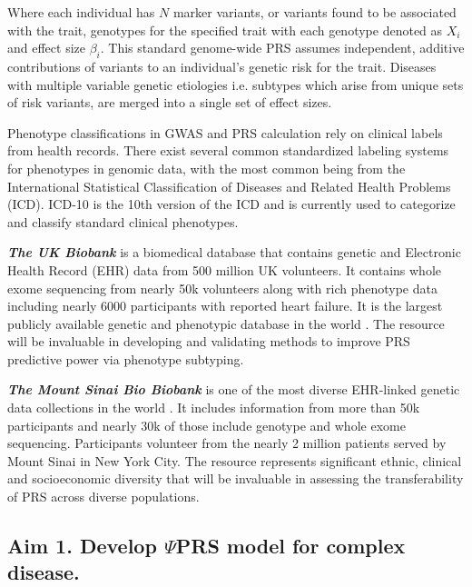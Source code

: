 \documentclass[11pt]{article}  %
\begin{document}
Where each individual has $N$ marker variants, or variants found to be associated with the trait, genotypes for the specified trait with each genotype denoted as $X_i$ and effect size $\beta_i$. This standard genome-wide PRS assumes independent, additive contributions of variants to an individual's genetic risk for the trait. Diseases with multiple variable genetic etiologies i.e. subtypes which arise from unique sets of risk variants, are merged into a single set of effect sizes.

Phenotype classifications in GWAS and PRS calculation rely on clinical labels from health records. There exist several common standardized labeling systems for phenotypes in genomic data, with the most common being from the International Statistical Classification of Diseases and Related Health Problems (ICD). ICD-10 is the 10th version of the ICD and is currently used to categorize and classify standard clinical phenotypes. 


\textbf{\textit{The UK Biobank}} is a biomedical database that contains genetic and Electronic Health Record (EHR) data from 500 million UK volunteers. It contains whole exome sequencing from nearly 50k volunteers along with rich phenotype data including nearly 6000 participants with reported heart failure. It is the largest publicly available genetic and phenotypic database in the world \cite{sudlow_uk_2015}. The resource will be invaluable in developing and validating methods to improve PRS predictive power via phenotype subtyping.

\textbf{\textit{The Mount Sinai Bio Biobank}} is one of the most diverse EHR-linked genetic data collections in the world \cite{belbin_toward_2021}. It includes information from more than 50k participants and nearly 30k of those include genotype and whole exome sequencing. Participants volunteer from the nearly 2 million patients served by Mount Sinai in New York City. The resource represents significant ethnic, clinical and socioeconomic diversity that will be invaluable in assessing the transferability of PRS across diverse populations.   


\subsection*{Aim 1. Develop $\Psi$PRS model for complex disease.}
\end{document}
